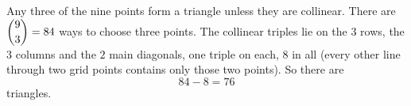 Any three of the nine points form a triangle unless they are collinear. There are $\dbinom93=84$ ways to choose three points. The collinear triples lie on the $3$ rows, the $3$ columns and the $2$ main diagonals, one triple on each, $8$ in all (every other line through two grid points contains only those two points). So there are
\[
84-8=\boxed{76}
\]
triangles.

